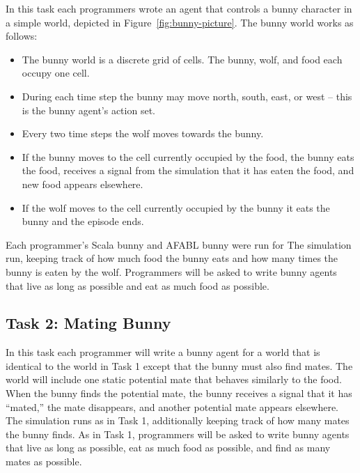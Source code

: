 In this task each programmers wrote an agent that controls a bunny character in a simple world, depicted in Figure~\ref{fig:bunny-picture}.  The bunny world works as follows:

\begin{itemize}

\item The bunny world is a discrete grid of cells.  The bunny, wolf, and food each occupy one cell.

\item During each time step the bunny may move north, south, east, or west -- this is the bunny agent's action set.

\item Every two time steps the wolf moves towards the bunny.

\item If the bunny moves to the cell currently occupied by the food, the bunny eats the food, receives a signal from the simulation that it has eaten the food, and new food appears elsewhere.

\item If the wolf moves to the cell currently occupied by the bunny it eats the bunny and the episode ends.

\end{itemize}

Each programmer's Scala bunny and AFABL bunny were run for The simulation run, keeping track of how much food the bunny eats and how many times the bunny is eaten by the wolf.  Programmers will be asked to write bunny agents that live as long as possible and eat as much food as possible.

\subsection{Task 2: Mating Bunny}\label{sec:task2}

In this task each programmer will write a bunny agent for a world that is identical to the world in Task 1 except that the bunny must also find mates.  The world will include one static  potential mate that behaves similarly to the food.  When the bunny finds the potential mate, the bunny receives a signal that it has ``mated,'' the mate disappears, and another potential mate appears elsewhere.  The simulation runs as in Task 1, additionally keeping track of how many mates the bunny finds.  As in Task 1, programmers will be asked to write bunny agents that live as long as possible, eat as much food as possible, and find as many mates as possible.

